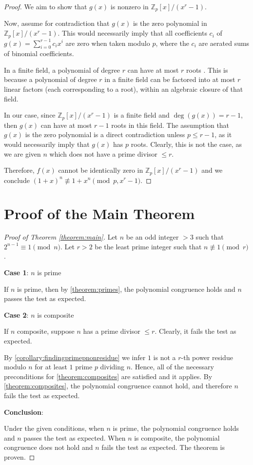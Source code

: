 \documentclass{article}
\theoremstyle{plain}
\theoremstyle{definition}
\newcommand{\D}{r}
\begin{document}
\begin{proof}
We aim to show that $g(x)$ is nonzero in $\mathbb{Z}_p[x]/(x^{\D} - 1)$.

Now, assume for contradiction that $g(x)$ is the zero polynomial in $\mathbb{Z}_p[x]/(x^{\D} - 1)$. This would necessarily imply that all coefficients $c_i$ of $g(x) = \sum_{i=0}^{\D-1} c_i x^i$ are zero when taken modulo $p$, where the $c_i$ are aerated sums of binomial coefficients.

In a finite field, a polynomial of degree $r$ can have at most $r$ roots \cite{dummit2004abstractalgebra}. This is because a polynomial of degree $r$ in a finite field can be factored into at most $r$ linear factors (each corresponding to a root), within an algebraic closure of that field.

In our case, since $\mathbb{Z}_p[x]/(x^{\D} - 1)$ is a finite field and $\deg(g(x)) = \D-1$, then $g(x)$ can have at most $\D-1$ roots in this field. The assumption that $g(x)$ is the zero polynomial is a direct contradiction unless $p \leq \D-1$, as it would necessarily imply that $g(x)$ has $p$ roots. Clearly, this is not the case, as we are given $n$ which does not have a prime divisor $\leq \D$.

Therefore, $f(x)$ cannot be identically zero in $\mathbb{Z}_p[x]/(x^\D - 1)$ and we conclude $(1 + x)^n \not\equiv 1 + x^n \pmod{p, x^\D - 1}$.
\end{proof}

\section{Proof of the Main Theorem}
\begin{proof}[Proof of Theorem \ref{theorem:main}]
Let $n$ be an odd integer $>3$ such that $2^{n-1} \equiv 1 \pmod{n}$. Let $\D > 2$ be the least prime integer such that $n \not\equiv 1 \pmod{\D}$.

\textbf{Case 1}: $n$ is prime

If $n$ is prime, then by \cref{theorem:primes}, the polynomial congruence holds and $n$ passes the test as expected.

\textbf{Case 2}: $n$ is composite

If $n$ composite, suppose $n$ has a prime divisor $\leq \D$. Clearly, it fails the test as expected.

By \cref{corollary:findingprimepnonresidue} we infer $1$ is not a $\D$-th power residue modulo $n$ for at least $1$ prime $p$ dividing $n$. Hence, all of the necessary preconditions for \cref{theorem:composites} are satisfied and it applies. By \cref{theorem:composites}, the polynomial congruence cannot hold, and therefore $n$ fails the test as expected.

\textbf{Conclusion}:

Under the given conditions, when $n$ is prime, the polynomial congruence holds and $n$ passes the test as expected. When $n$ is composite, the polynomial congruence does not hold and $n$ fails the test as expected. The theorem is proven.
\end{proof}
\end{document}
